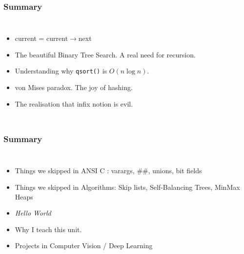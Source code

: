 \documentclass{beamer}
\begin{document}
\begin{frame}
\frametitle{Summary}
\begin{columns}
  \begin{itemize}
    \pause
     \item current = current$\rightarrow$next
    \pause
     \item The beautiful Binary Tree Search. A real
     need for recursion.
    \pause
     \item Understanding why {\tt qsort()} is $O(n \log n)$.
    \pause
     \item von Mises paradox. The joy of hashing.
    \pause
     \item The realisation that infix notion is evil.
  \end{itemize}
\end{columns}
\end{frame}

\begin{frame}
\frametitle{Summary}
\begin{columns}
  \begin{itemize}
    \pause
     \item Things we skipped in ANSI C : varargs, $\#\#$, unions, bit fields
    \pause
     \item Things we skipped in Algorithms: Skip lists, Self-Balancing Trees, MinMax Heaps
    \pause
     \item {\it Hello World}
    \pause
     \item Why I teach this unit.
    \pause
     \item Projects in Computer Vision / Deep Learning
  \end{itemize}
\end{columns}
\end{frame}
\end{document}
